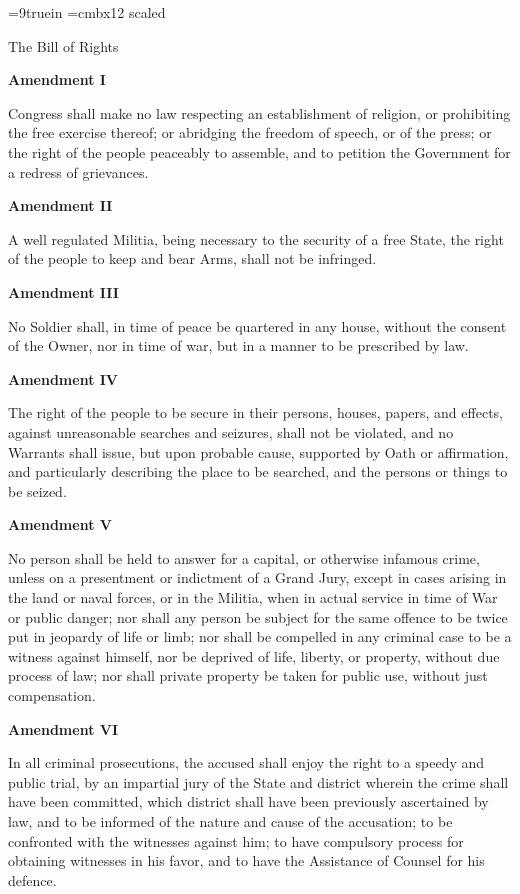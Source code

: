 \nopagenumbers
\vsize=9truein
\def\am#1{\par\vfil{\bf #1}\par\nobreak\smallskip\nobreak\noindent}
\leftskip=18pt
\parindent=-18pt
\font\big=cmbx12 scaled

\centerline{\big The Bill of Rights}
\medskip
\am{Amendment I}%
Congress shall make no law respecting an establishment of religion, or
prohibiting the free exercise thereof; or abridging the freedom of
speech, or of the press; or the right of the people peaceably to
assemble, and to petition the Government for a redress of grievances.

\am{Amendment II}%
A well regulated Militia, being necessary to the security of a free
State, the right of the people to keep and bear Arms, shall not be
infringed.

\am{Amendment III}%
No Soldier shall, in time of peace be quartered in any house, without
the consent of the Owner, nor in time of war, but in a manner to be
prescribed by law.

\am{Amendment IV}%
The right of the people to be secure in their persons, houses, papers,
and effects, against unreasonable searches and seizures, shall not be
violated, and no Warrants shall issue, but upon probable cause,
supported by Oath or affirmation, and particularly describing the
place to be searched, and the persons or things to be seized.

\am{Amendment V}%
No person shall be held to answer for a capital, or otherwise infamous
crime, unless on a presentment or indictment of a Grand Jury, except
in cases arising in the land or naval forces, or in the Militia, when
in actual service in time of War or public danger; nor shall any
person be subject for the same offence to be twice put in jeopardy of
life or limb; nor shall be compelled in any criminal case to be a
witness against himself, nor be deprived of life, liberty, or
property, without due process of law; nor shall private property be
taken for public use, without just compensation.

\am{Amendment VI}%
In all criminal prosecutions, the accused shall enjoy the right to a
speedy and public trial, by an impartial jury of the State and
district wherein the crime shall have been committed, which district
shall have been previously ascertained by law, and to be informed of
the nature and cause of the accusation; to be confronted with the
witnesses against him; to have compulsory process for obtaining
witnesses in his favor, and to have the Assistance of Counsel for his
defence.

